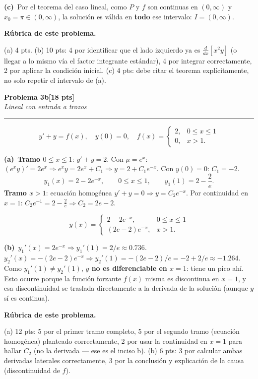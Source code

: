 \documentclass[11pt,letterpaper]{article}
\newcommand{\problema}[3]{%
  \bigskip\noindent
  {\large\textbf{Problema #1}}\hfill\textbf{[#2 pts]}\\[3pt]
  {\small\itshape #3}\par
  \vspace{2pt}\hrule\vspace{8pt}
}
\newcommand{\subparte}[2]{%
  \medskip\noindent\textbf{(#1}\ #2\par\smallskip
}
\newenvironment{resultado}
  {\begin{mdframed}[linecolor=black,linewidth=0.6pt,
    innerleftmargin=6pt,innerrightmargin=6pt,innertopmargin=4pt,innerbottommargin=4pt]
   \bfseries}
  {\end{mdframed}}
\newenvironment{rubrica}{%
  \begin{mdframed}[linecolor=black,linewidth=0.6pt,
    innerleftmargin=8pt,innerrightmargin=8pt,innertopmargin=5pt,innerbottommargin=5pt]
  \small\textbf{Rúbrica de este problema.}\par\smallskip
}{\end{mdframed}}
\begin{document}
\subparte{c)}{Por el teorema del caso lineal, como $P$ y $f$ son continuas en $(0,\infty)$ y $x_0=\pi\in(0,\infty)$, la solución es válida en \textbf{todo} ese intervalo: $I=(0,\infty)$.}

\begin{rubrica}
(a) 4 pts. (b) 10 pts: 4 por identificar que el lado izquierdo ya es $\frac{d}{dx}[x^2y]$ (o llegar a lo mismo vía el factor integrante estándar), 4 por integrar correctamente, 2 por aplicar la condición inicial. (c) 4 pts: debe citar el teorema explícitamente, no solo repetir el intervalo de (a).
\end{rubrica}

\problema{3b}{18}{Lineal con entrada a trozos}

\[
y'+y=f(x), \quad y(0)=0, \quad f(x)=\begin{cases}2, & 0\le x\le1\\0,&x>1.\end{cases}
\]

\subparte{a)}{\textbf{Tramo $0\le x\le1$}: $y'+y=2$. Con $\mu=e^x$: $(e^xy)'=2e^x \Rightarrow e^xy=2e^x+C_1 \Rightarrow y=2+C_1e^{-x}$. Con $y(0)=0$: $C_1=-2$.
\[
y_1(x) = 2-2e^{-x}, \qquad 0\le x\le1, \qquad y_1(1)=2-\frac2e.
\]
\textbf{Tramo $x>1$}: ecuación homogénea $y'+y=0 \Rightarrow y=C_2e^{-x}$. Por continuidad en $x=1$: $C_2e^{-1}=2-\frac2e \Rightarrow C_2=2e-2$.
\begin{resultado}
\[
y(x)=\begin{cases}2-2e^{-x}, & 0\le x\le1\\ (2e-2)e^{-x}, & x>1.\end{cases}
\]
\end{resultado}}

\subparte{b)}{$y_1'(x)=2e^{-x} \Rightarrow y_1'(1)=2/e\approx0.736$. $y_2'(x)=-(2e-2)e^{-x} \Rightarrow y_2'(1)=-(2e-2)/e = -2+2/e\approx-1.264$. Como $y_1'(1)\neq y_2'(1)$, \textbf{$y$ no es diferenciable en $x=1$}: tiene un pico ahí. Esto ocurre porque la función forzante $f(x)$ misma es discontinua en $x=1$, y esa discontinuidad se traslada directamente a la derivada de la solución (aunque $y$ sí es continua).}

\begin{rubrica}
(a) 12 pts: 5 por el primer tramo completo, 5 por el segundo tramo (ecuación homogénea) planteado correctamente, 2 por usar la continuidad en $x=1$ para hallar $C_2$ (no la derivada — ese es el inciso b). (b) 6 pts: 3 por calcular ambas derivadas laterales correctamente, 3 por la conclusión y explicación de la causa (discontinuidad de $f$).
\end{rubrica}
\end{document}

